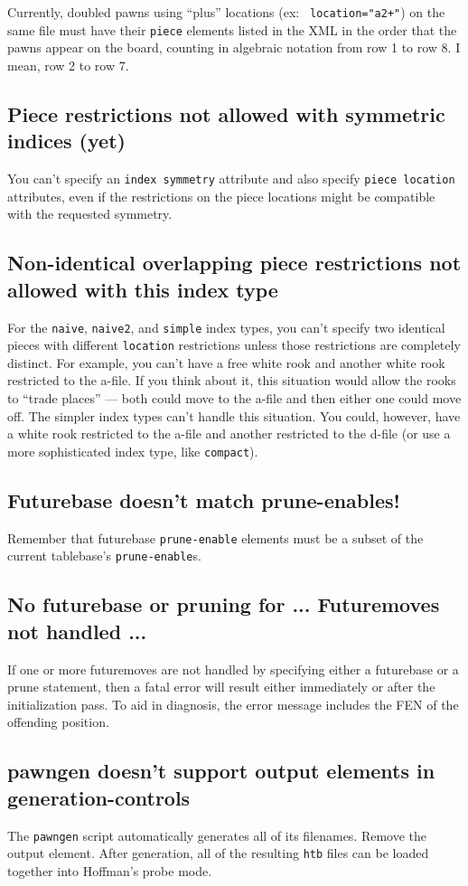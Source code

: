 \documentclass[11pt]{article}
\begin{document}
Currently, doubled pawns using ``plus'' locations (ex: {\tt
location="a2+"}) on the same file must have their {\tt piece} elements
listed in the XML in the order that the pawns appear on the board,
counting in algebraic notation from row 1 to row 8.  I mean, row 2 to
row 7.

\subsection{Piece restrictions not allowed with symmetric indices (yet)}

You can't specify an {\tt index symmetry} attribute and also specify
{\tt piece location} attributes, even if the restrictions on the piece
locations might be compatible with the requested symmetry.

\subsection{Non-identical overlapping piece restrictions not allowed with this index type}

For the {\tt naive}, {\tt naive2}, and {\tt simple} index types, you
can't specify two identical pieces with different {\tt location}
restrictions unless those restrictions are completely distinct.  For
example, you can't have a free white rook and another white rook
restricted to the a-file.  If you think about it, this situation would
allow the rooks to ``trade places'' --- both could move to the a-file
and then either one could move off.  The simpler index types can't
handle this situation.  You could, however, have a white rook
restricted to the a-file and another restricted to the d-file (or use
a more sophisticated index type, like {\tt compact}).

\subsection{Futurebase doesn't match prune-enables!}

Remember that futurebase {\tt prune-enable} elements must be a
subset of the current tablebase's {\tt prune-enable}s.


\subsection{No futurebase or pruning for ... \hfil\break Futuremoves not handled ...}

If one or more futuremoves are not handled by specifying either a
futurebase or a prune statement, then a fatal error will result either
immediately or after the initialization pass.  To aid in diagnosis,
the error message includes the FEN of the offending position.

\subsection{pawngen doesn't support output elements in generation-controls}

The {\tt pawngen} script automatically generates all of its filenames.
Remove the output element.  After generation, all of the resulting
{\tt htb} files can be loaded together into Hoffman's probe mode.
\end{document}
